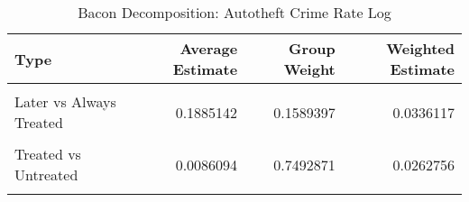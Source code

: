 \begin{table}[H]

\caption{\label{tab:tab:bacondecompositionAutotheft}Bacon Decomposition: Autotheft Crime Rate Log}
\centering
\begin{tabular}[t]{lrrr}
\toprule
Type & Average Estimate & Group Weight & Weighted Estimate\\
\midrule
\cellcolor{gray!6}{Earlier vs Later Treated} & \cellcolor{gray!6}{0.0887179} & \cellcolor{gray!6}{0.0683810} & \cellcolor{gray!6}{0.0056843}\\
Later vs Always Treated & 0.1885142 & 0.1589397 & 0.0336117\\
\cellcolor{gray!6}{Later vs Earlier Treated} & \cellcolor{gray!6}{0.0994063} & \cellcolor{gray!6}{0.0233921} & \cellcolor{gray!6}{0.0020305}\\
Treated vs Untreated & 0.0086094 & 0.7492871 & 0.0262756\\
\cellcolor{gray!6}{Total TWFE} & \cellcolor{gray!6}{NaN} & \cellcolor{gray!6}{NaN} & \cellcolor{gray!6}{0.0676020}\\
\bottomrule
\end{tabular}
\end{table}

